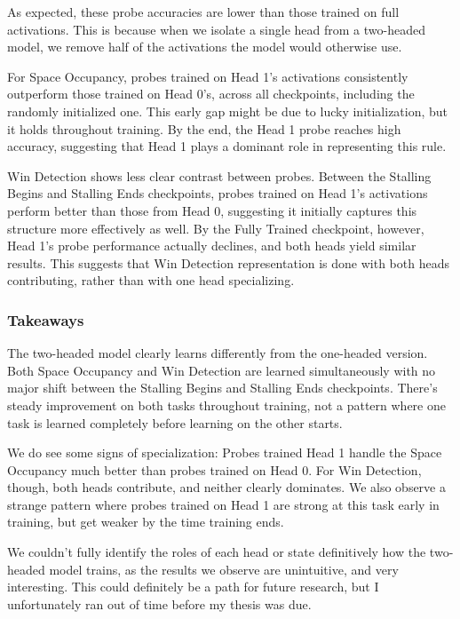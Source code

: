 \documentclass[11pt]{article}
\begin{document}
As expected, these probe accuracies are lower than those trained on full
activations. This is because when we isolate a single head from a
two-headed model, we remove half of the activations the model would
otherwise use.

For Space Occupancy, probes trained on Head 1's activations consistently
outperform those trained on Head 0's, across all checkpoints, including
the randomly initialized one. This early gap might be due to lucky
initialization, but it holds throughout training. By the end, the Head 1
probe reaches high accuracy, suggesting that Head 1 plays a dominant
role in representing this rule.

Win Detection shows less clear contrast between probes. Between the
Stalling Begins and Stalling Ends checkpoints, probes trained on Head
1's activations perform better than those from Head 0, suggesting it
initially captures this structure more effectively as well. By the Fully
Trained checkpoint, however, Head 1's probe performance actually
declines, and both heads yield similar results. This suggests that Win
Detection representation is done with both heads contributing, rather
than with one head specializing.

    \subsubsection{Takeaways}\label{takeaways}

The two-headed model clearly learns differently from the one-headed
version. Both Space Occupancy and Win Detection are learned
simultaneously with no major shift between the Stalling Begins and
Stalling Ends checkpoints. There's steady improvement on both tasks
throughout training, not a pattern where one task is learned completely
before learning on the other starts.

We do see some signs of specialization: Probes trained Head 1 handle the
Space Occupancy much better than probes trained on Head 0. For Win
Detection, though, both heads contribute, and neither clearly dominates.
We also observe a strange pattern where probes trained on Head 1 are
strong at this task early in training, but get weaker by the time
training ends.

We couldn't fully identify the roles of each head or state definitively
how the two-headed model trains, as the results we observe are
unintuitive, and very interesting. This could definitely be a path for
future research, but I unfortunately ran out of time before my thesis
was due.
\end{document}
